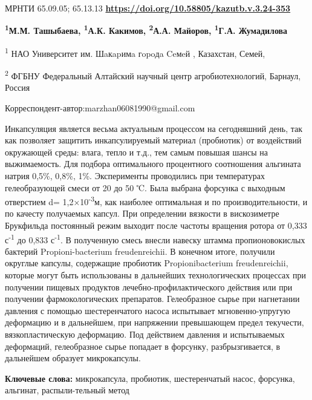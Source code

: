 \newpage
МРНТИ 65.09.05; 65.13.13
\hfill {\bfseries \href{https://doi.org/10.58805/kazutb.v.3.24-353}{https://doi.org/10.58805/kazutb.v.3.24-353}}


\begin{center}

{\bfseries \textsuperscript{1}М.М. Ташыбаева\envelope,
\textsuperscript{1}А.К. Какимов, \textsuperscript{2}А.А. Майоров,
\textsuperscript{1}Г.А. Жумадилова}

\textsuperscript{1} НАО Университет им. Шaкapимa гopoдa Ceмeй ,
Казахстан, Семей,

\textsuperscript{2} ФГБНУ Федеральный Алтайский научный центр
агробиотехнологий, Барнаул, Россия
\end{center}
\envelope Корреспондент-автор:marzhan06081990@gmail.com \vspace{0.5cm}


Инкапсуляция является весьма актуальным процессом на сегодняшний день,
так как позволяет защитить инкапсулируемый материал (пробиотик) от
воздействий окружающей среды: влага, тепло и т.д., тем самым повышая
шансы на выжимаемость. Для подбора оптимального процентного соотношения
альгината натрия 0,5\%, 0,8\%, 1\%. Эксперименты проводились при
температурах гелеобразующей смеси от 20 до 50 ℃. Была выбрана форсунка с
выходным отверстием d= 1,2×10\textsuperscript{-3}м, как наиболее
оптимальная и по производительности, и по качесту получаемых капсул. При
определении вязкости в вискозиметре Брукфильда постоянный режим выходит
после частоты вращения ротора от 0,333 с\textsuperscript{-1} до 0,833
с\textsuperscript{-1}. В полученную смесь внесли навеску штамма
пропионовокислых бактерий Propioni-bacterium freudenreichii. В конечном
итоге, получили округлые капсулы, содержащие пробиотик Propionibacterium
freudenreichii, которые могут быть использованы в дальнейших
технологических процессах при получении пищевых продуктов
лечебно-профилактического действия или при получении фармокологических
препаратов. Гелеобразное сырье при нагнетании давления с помощью
шестеренчатого насоса испытывает мгновенно-упругую деформацию и в
дальнейшем, при напряжении превышающем предел текучести,
вязкопластическую деформацию. Под действием давления и испытываемых
деформаций, гелеобразное сырье попадает в форсунку, разбрызгивается, в
дальнейшем образует микрокапсулы.

{\bfseries Ключевые слова:} микрокапсула, пробиотик, шестеренчатый насос,
форсунка, альгинат, распыли-тельный метод

